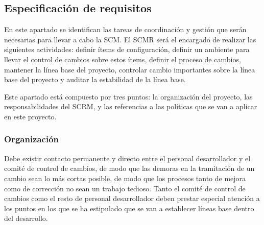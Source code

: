 \subsection{Especificación de requisitos}
\par En este apartado se identifican las tareas de coordinación y gestión que serán necesarias para llevar a cabo la
SCM. El SCMR será el encargado de realizar las siguientes actividades: definir ítems de configuración, definir un
ambiente para llevar el control de cambios sobre estos ítems, definir el proceso de cambios, mantener la línea
base del proyecto, controlar cambio importantes sobre la línea base del proyecto y auditar la estabilidad de la
línea base.
\par Este apartado está compuesto por tres puntos: la organización del proyecto, las responsabilidades del SCRM,
y las referencias a las políticas que se van a aplicar en este proyecto.

\subsubsection{Organización}
\par Debe existir contacto permanente y directo entre el personal desarrollador y el comité de control de cambios,
de modo que las demoras en la tramitación de un cambio sean lo más cortas posible, de modo que los procesos
tanto de mejora como de corrección no sean un trabajo tedioso. Tanto el comité de control de cambios como el
resto de personal desarrollador deben prestar especial atención a los puntos en los que se ha estipulado que se
van a establecer líneas base dentro del desarrollo.

